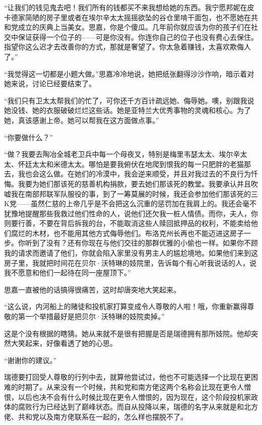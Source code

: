 \par “让我们的钱见鬼去吧！我们所有的钱都买不来我想给她的东西。我宁愿邦妮在皮卡德家简陋的房子里或者在埃尔辛太太摇摇欲坠的谷仓里啃干面包，也不愿她在共和党成立的庆典上当美女。思嘉，你是个傻瓜。几年前你就应该为你的孩子们在社交中保证获得一个位子的——可是你没有。你连你自己的位子也没有费心去保住。指望你这么迟才去改善你的方式，那就是奢望了。你太急着赚钱，太喜欢欺侮人了。”
\par “我觉得这一切都是小题大做。”思嘉冷冷地说，她把纸张翻得沙沙作响，暗示着对她来说，讨论已经要结束了。
\par “我们只有卫太太帮我们的忙了，可你还千方百计疏远她、侮辱她。噢，别跟我说她没钱、她的衣服破破烂烂这些话。她是亚特兰大优秀事物的灵魂和核心。为了她，真该感谢上帝。她可以帮我在这方面做点事。”
\par “你要做什么？”
\par “做？我要去陶冶全城老卫兵中每一个母夜叉，特别是梅里韦瑟太太、埃尔辛太太、怀廷太太和米德太太。哪怕是要我俯伏在地爬到恨我的每一只肥胖的老猫那去，我也会这么做。在她们的冷漠中，我会逆来顺受，并且对我过去的不良行为忏悔。我要为她们那该死的慈善机构捐款，要去她们那该死的教堂。我要承认并且吹嘘我在南部邦联军队服役的事，到了一筹莫展的时候，我还会参加他们那该死的三K党——虽然仁慈的上帝几乎是不会把这么沉重的惩罚加在我肩上的。我还会毫不犹豫地提醒那些我救过他们性命的人，说他们还欠我一桩人情债。而你，夫人，你则要行善，不要在背后拆我的台，不能取消这些人赎回抵押品的权利，不能卖给他们腐烂的木材，也不能用其他方式侮辱他们。布洛克州长再也不能迈进这房子一步。你听到了没有？还有你现在与他们交往的那群优雅的小偷也一样。如果你不顾我的请求而邀请了他们，你就会陷入家里没有男主人的尴尬境地。如果他们来到这房子里，我就把时间花在贝尔·沃特琳的妓院里，告诉每个有心听我说话的人，说我不愿意和他们一起待在同一座屋顶下。”
\par 思嘉一直被他的话搞得很痛苦，这时却唐突地大笑起来。
\par “这么说，内河船上的赌徒和投机家打算变成令人尊敬的人啦！哦，你重新赢得尊敬的第一个举措最好是把贝尔·沃特琳的妓院卖掉。”
\par 这是个没有根据的瞎猜。她从来就不是很有把握是否是瑞德拥有那所妓院。他却突然大笑起来，好像看透了她的心思。
\par “谢谢你的建议。”
\par 瑞德要打回受人尊敬的行列中去，就算他尝试过，他也不可能选择一个比现在更困难的时期了。从来没有一个时候，共和党和南方佬这两个名称会比现在更令人憎恨，以后也决不会有什么时候比现在更令人憎恨的，因为现在，这个阶段投机家政体的腐败行为已经达到了巅峰状态。而自从投降以来，瑞德的名字从来就是和北方佬、共和党以及南方佬联系在一起的，怎么样也摆脱不了。

